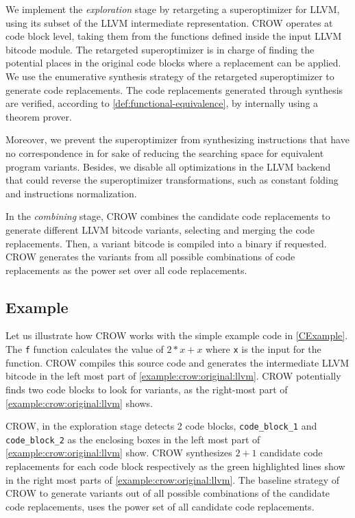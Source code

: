 We implement the \emph{exploration} stage  by retargeting a superoptimizer for  LLVM, using its subset of the LLVM intermediate representation. CROW operates at code block  level, taking them from the functions defined inside the input LLVM bitcode module. The retargeted superoptimizer is in charge of finding the potential places in the original code blocks where a replacement can be applied. We use the enumerative synthesis strategy of the retargeted superoptimizer to generate code replacements.
The code replacements generated through synthesis are verified, according to \autoref{def:functional-equivalence}, by internally using a theorem prover. 

Moreover, we prevent the superoptimizer from synthesizing instructions that have no correspondence in \wasm for sake of reducing the searching space for equivalent program variants. Besides, we disable all optimizations in the \wasm LLVM backend that could reverse the superoptimizer transformations, such as constant folding and instructions normalization.


In the \emph{combining} stage, CROW combines the candidate code replacements to generate different LLVM bitcode variants, selecting and merging the code replacements. 
Then, a variant bitcode is compiled into a \wasm binary if requested. CROW generates the variants from all possible combinations of code replacements as the power set over all code replacements.  

\subsection{Example}
\label{section:crow:example}
 Let us illustrate how CROW works with the simple example code in \autoref{CExample}. The \texttt{f} function calculates the value of $2 * x + x$ where \texttt{x} is the input for the function.  CROW compiles this source code and generates the intermediate LLVM bitcode in the left most part of \autoref{example:crow:original:llvm}. CROW potentially finds two code blocks to look for variants, as the right-most part of \autoref{example:crow:original:llvm} shows.


    

CROW, in the exploration stage detects 2 code blocks, \texttt{code\_block\_1} and \texttt{code\_block\_2} as the enclosing boxes in the left most part of \autoref{example:crow:original:llvm} show. CROW synthesizes $2 + 1$ candidate code replacements for each code block respectively as the green highlighted lines show in the right most parts of \autoref{example:crow:original:llvm}.
The baseline strategy of CROW to generate variants out of all possible combinations of the candidate code replacements, \ie uses the power set of all candidate code replacements.


